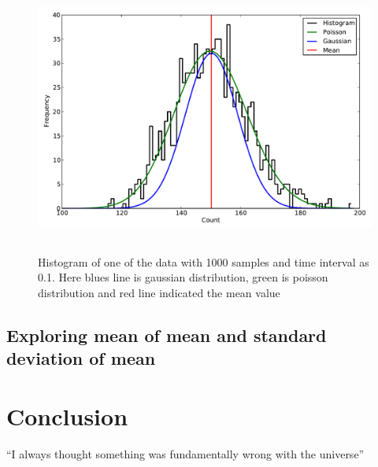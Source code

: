 \documentclass[a4paper,12pt]{article}
\begin{document}
\begin{figure}[H]
\centering
\includegraphics[angle=0,height=9cm,width=15.5cm]{graphs/Hist_distribution_big.pdf}
\caption{Histogram of one of the data with 1000 samples and time interval as 0.1. Here blues line is gaussian distribution, green is poisson distribution and red line indicated the mean value}
\label{fig:dark_hist}
\end{figure}


\subsection{Exploring mean of mean and standard deviation of mean}
\label{sec:MOM_SDOM}



\section{Conclusion}
``I always thought something was fundamentally wrong with the universe'' \citep{adams1995hitchhiker}



\end{document}

